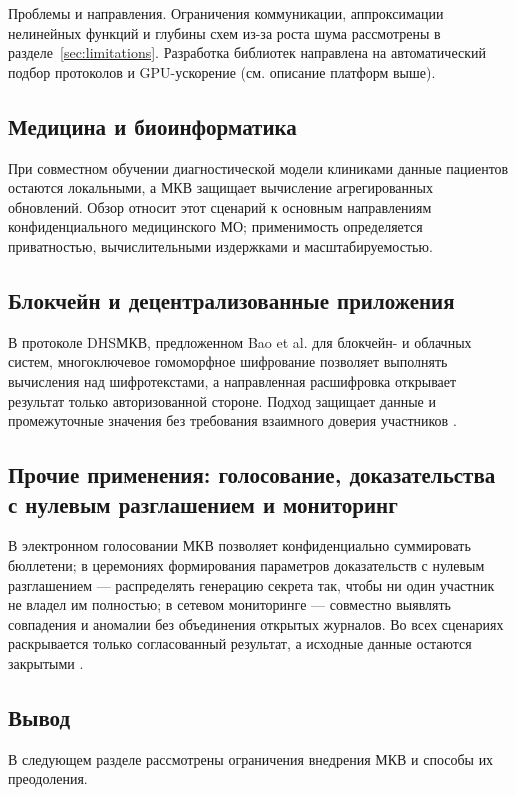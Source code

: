 Проблемы и направления. Ограничения коммуникации, аппроксимации нелинейных функций и глубины схем из-за роста шума рассмотрены в разделе~\ref{sec:limitations}. Разработка библиотек направлена на автоматический подбор протоколов и GPU-ускорение (см. описание платформ выше).

\subsection{Медицина и биоинформатика}

При совместном обучении диагностической модели клиниками данные пациентов остаются локальными, а МКВ защищает вычисление агрегированных обновлений. Обзор \cite{11} относит этот сценарий к основным направлениям конфиденциального медицинского МО; применимость определяется приватностью, вычислительными издержками и масштабируемостью.

\subsection{Блокчейн и децентрализованные приложения}

В протоколе DHSМКВ, предложенном Bao et al. для блокчейн- и облачных систем, многоключевое гомоморфное шифрование позволяет выполнять вычисления над шифротекстами, а направленная расшифровка открывает результат только авторизованной стороне. Подход защищает данные и промежуточные значения без требования взаимного доверия участников \cite{05}.

\subsection{Прочие применения: голосование, доказательства с нулевым разглашением и мониторинг}

В электронном голосовании МКВ позволяет конфиденциально суммировать бюллетени; в церемониях формирования параметров доказательств с нулевым разглашением --- распределять генерацию секрета так, чтобы ни один участник не владел им полностью; в сетевом мониторинге --- совместно выявлять совпадения и аномалии без объединения открытых журналов. Во всех сценариях раскрывается только согласованный результат, а исходные данные остаются закрытыми \cite{06}.

\subsection{Вывод}

В следующем разделе рассмотрены ограничения внедрения МКВ и способы их преодоления.